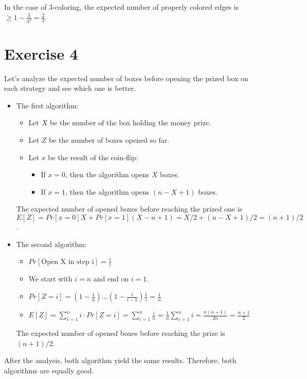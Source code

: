 \documentclass[12pt, a4paper]{article} %
\begin{document}
In the case of $3$-coloring, the expected number of properly colored edges is $\ge 1 - \frac{3}{3^{2}} = \frac{2}{3}$.


\section*{Exercise 4}%
\label{sec:exercise_4}

Let's analyze the expected number of boxes before opening the prized box on each strategy and see which one is better.

\begin{itemize}
  \item The first algorithm:

    \begin{itemize}
      \item[] Let $X$ be the number of the box holding the money prize.
      \item[] Let $Z$ be the number of boxes opened so far.
      \item[] Let $x$ be the result of the coin-flip:
        \begin{itemize}
          \item[] If $x = 0$, then the algorithm opens $X$ boxes.
          \item[] If $x = 1$, then the algorithm opens $(n - X + 1)$ boxes.
        \end{itemize}
    \end{itemize}

    The expected number of opened boxes before reaching the prized one is $E[Z] = Pr[x = 0] X + Pr[x = 1] (X - n + 1) = X/2 + (n - X + 1)/2 = (n + 1)/ 2$.

  \item The second algorithm:

    \begin{itemize}
      \item[] $Pr[\text{Open X in step i}] = \frac{1}{i}$
      \item[] We start with $i = n$ and end on $i = 1$.
      \item[] $Pr[Z = i] = (1 - \frac{1}{n}) \ldots (1 - \frac{1}{i - 1}) \frac{1}{i}  = \frac{1}{n}$
      \item[] $E[Z] = \sum_{i = 1}^{n} i \cdot Pr[Z = i] = \sum_{i = 1}^{n} \frac{i}{n} = \frac{1}{n} \sum_{i = 1}^{n} i = \frac{n(n + 1)}{2n} = \frac{n+1}{2}$
    \end{itemize}

    The expected number of opened boxes before reaching the prize is $(n + 1)/2$.
\end{itemize}

After the analysis, both algorithm yield the same results. Therefore, both algorithms are equally good.


% 
\end{document}
